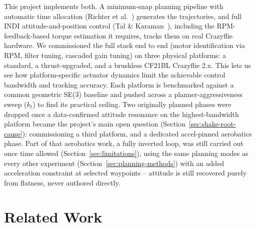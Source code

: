 \documentclass[11pt,a4paper]{article}
\begin{document}
This project implements both. A minimum-snap planning pipeline with automatic time allocation
(Richter et al.~\cite{richter2016}) generates the trajectories, and full INDI attitude-and-position
control (Tal \& Karaman~\cite{tal2020}), including the RPM-feedback-based torque estimation it requires,
tracks them on real Crazyflie hardware. We commissioned the full stack end to end (motor
identification via RPM, filter tuning, cascaded gain tuning) on three physical platforms: a
standard, a thrust-upgraded, and a brushless CF21BL Crazyflie 2.x. This lets us see how
platform-specific actuator dynamics limit the achievable control bandwidth and tracking accuracy.
Each platform is benchmarked against a common geometric SE(3) baseline and pushed across a
planner-aggressiveness sweep ($k_t$) to find its practical ceiling. Two originally planned phases
were dropped once a data-confirmed attitude resonance on the
highest-bandwidth platform became the project's main open question
(Section~\ref{sec:shake-root-cause}): commissioning a third platform, and a dedicated accel-pinned
aerobatics phase. Part of that aerobatics work, a fully inverted loop, was still carried out once
time allowed (Section~\ref{sec:limitations}), using the same planning modes as
every other experiment (Section~\ref{sec:planning-methods}) with an added acceleration constraint
at selected waypoints -- attitude is still recovered purely from flatness, never authored directly.

\section{Related Work}
\end{document}
